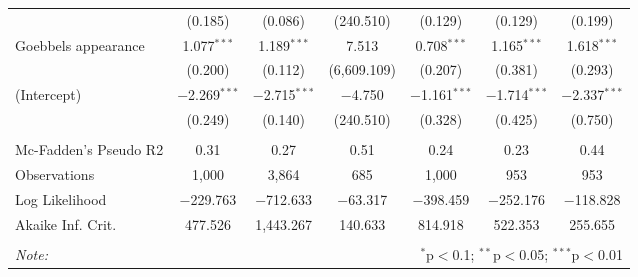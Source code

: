 \begin{table}[t!]
\begin{tabular}{@{\extracolsep{1pt}}lcccccc}
  & (0.185) & (0.086) & (240.510) & (0.129) & (0.129) & (0.199) \\ 
  Goebbels appearance & 1.077$^{***}$ & 1.189$^{***}$ & 7.513 & 0.708$^{***}$ & 1.165$^{***}$ & 1.618$^{***}$ \\ 
  & (0.200) & (0.112) & (6,609.109) & (0.207) & (0.381) & (0.293) \\ 
  (Intercept) & $-$2.269$^{***}$ & $-$2.715$^{***}$ & $-$4.750 & $-$1.161$^{***}$ & $-$1.714$^{***}$ & $-$2.337$^{***}$ \\ 
  & (0.249) & (0.140) & (240.510) & (0.328) & (0.425) & (0.750) \\ 
 \hline \\[-1.8ex] 
Mc-Fadden's Pseudo R2 & 0.31 & 0.27 & 0.51 & 0.24 & 0.23 & 0.44 \\ 
Observations & 1,000 & 3,864 & 685 & 1,000 & 953 & 953 \\ 
Log Likelihood & $-$229.763 & $-$712.633 & $-$63.317 & $-$398.459 & $-$252.176 & $-$118.828 \\ 
Akaike Inf. Crit. & 477.526 & 1,443.267 & 140.633 & 814.918 & 522.353 & 255.655 \\ 
\hline 
\hline \\[-1.8ex] 
\textit{Note:}  & \multicolumn{6}{r}{$^{*}$p$<$0.1; $^{**}$p$<$0.05; $^{***}$p$<$0.01} \\ 
\end{tabular} 
\end{table} 

